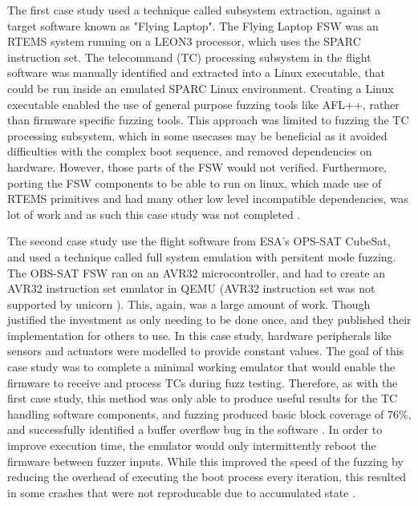 \documentclass[../report.tex]{subfiles}
\begin{document}
The first case study used a technique called subsystem extraction, against a
target software known as "Flying Laptop". The Flying Laptop FSW was an RTEMS
system running on a LEON3 processor, which uses the SPARC instruction set. The
telecommand (TC) processing subsystem in the flight software was manually
identified and extracted into a Linux executable, that could be run inside an
emulated SPARC Linux environment. Creating a Linux executable enabled the use
of general purpose fuzzing tools like AFL++, rather than firmware specific
fuzzing tools. This approach was limited to fuzzing the TC processing
subsystem, which in some usecases may be beneficial as it avoided difficulties
with the complex boot sequence, and removed dependencies on hardware. However,
those parts of the FSW would not verified. Furthermore, porting the FSW
components to be able to run on linux, which made use of RTEMS primitives and
had many other low level incompatible dependencies, was lot of work and as such
this case study was not completed \citep{Willbold_2024}.

The second case study use the flight software from ESA's OPS-SAT CubeSat, and
used a technique \citet{Willbold_2024} called full system emulation with
persitent mode fuzzing. The OBS-SAT FSW ran on an AVR32 microcontroller, and
\citet{Willbold_2024} had to create an AVR32 instruction set emulator in QEMU
(AVR32 instruction set was not supported by unicorn \citep{Unicorn}). This,
again, was a large amount of work. Though \citet{Willbold_2024} justified the
investment as only needing to be done once, and they published their
implementation for others to use. In this case study, hardware peripherals like
sensors and actuators were modelled to provide constant values. The goal of
this case study was to complete a minimal working emulator that would enable
the firmware to receive and process TCs during fuzz testing. Therefore, as with
the first case study, this method was only able to produce useful results for
the TC handling software components, and fuzzing produced basic block coverage
of 76\%, and successfully identified a buffer overflow bug in the software
\citep{Willbold_2024}. In order to improve execution time, the emulator would
only intermittently reboot the firmware between fuzzer inputs. While this
improved the speed of the fuzzing by reducing the overhead of executing the
boot process every iteration, this resulted in some crashes that were not
reproducable due to accumulated state \citep{Willbold_2024}.
\end{document}
